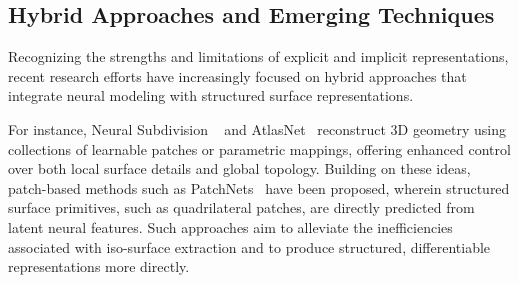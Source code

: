 \subsection{Hybrid Approaches and Emerging Techniques}

Recognizing the strengths and limitations of explicit and implicit representations, recent research efforts have increasingly focused on hybrid approaches that integrate neural modeling with structured surface representations.  

For instance, Neural Subdivision ~\cite{liu2020} and AtlasNet~\cite{groueix2018} reconstruct 3D geometry using collections of learnable patches or parametric mappings, offering enhanced control over both local surface details and global topology.  
Building on these ideas, patch-based methods such as PatchNets~\cite{sivaram2024} have been proposed, wherein structured surface primitives, such as quadrilateral patches, are directly predicted from latent neural features.  
Such approaches aim to alleviate the inefficiencies associated with iso-surface extraction and to produce structured, differentiable representations more directly.  
